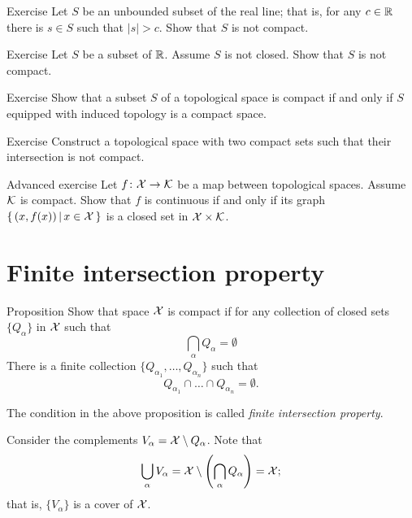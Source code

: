 \begin{thm}{Exercise}\label{ex:unbounded-noncompact}
Let $S$ be an unbounded subset of the real line; that is, for any $c\in \mathbb{R}$ there is $s\in S$ such that $|s|>c$.
Show that $S$ is not compact.
\end{thm}

\begin{thm}{Exercise}\label{ex:closed-compact}
Let $S$ be a subset of $\mathbb{R}$.
Assume $S$ is not closed.
Show that $S$ is not compact.
\end{thm}

\begin{thm}{Exercise}\label{ex:compact-set-subspace}
Show that a subset $S$ of a topological space is compact if and only if $S$ equipped with induced topology is a compact space.
\end{thm}

\begin{thm}{Exercise}\label{ex:noncompact-n}
Construct a topological space with two compact sets such that their intersection is not compact.
\end{thm}

\begin{thm}{Advanced exercise}\label{ex:closed-graph} 
Let $f\colon\mathcal{X}\to\mathcal{K}$ be a map between topological spaces.
Assume $\mathcal{K}$ is compact.
Show that $f$ is continuous if and only if its graph $\left\{\,{(x,f(x))}\,\middle|\,{x\in\mathcal{X}}\,\right\}$ is a closed set in $\mathcal{X}\times\mathcal{K}$. 
\end{thm}

\section{Finite intersection property} 

\begin{thm}{Proposition}
Show that space $\mathcal{X}$ is compact if for any collection of closed sets $\{Q_\alpha\}$ in $\mathcal{X}$ such that 
\[\bigcap_{\alpha}Q_\alpha=\emptyset\]
There is a finite collection $\{Q_{\alpha_1},\dots,Q_{\alpha_n}\}$
such that
\[Q_{\alpha_1}\cap\dots\cap Q_{\alpha_n}=\emptyset.\]

\end{thm}

The condition in the above proposition is called \emph{finite intersection property}.

Consider the complements $V_\alpha=\mathcal{X}\setminus Q_\alpha$.
Note that 
\[\bigcup_\alpha V_\alpha=\mathcal{X}\setminus \left(\bigcap_{\alpha}Q_\alpha\right)=\mathcal{X};\]
that is, $\{V_\alpha\}$ is a cover of $\mathcal{X}$.


